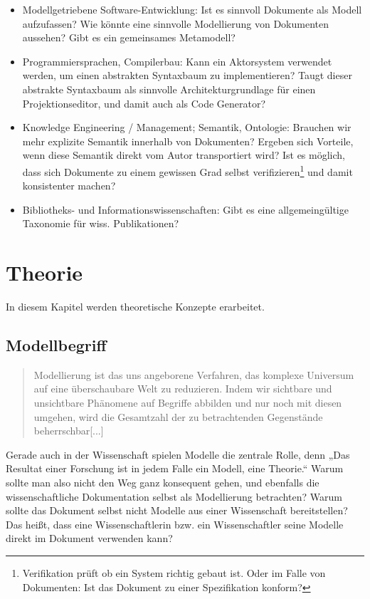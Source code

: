  
\begin{itemize}

\item
Modellgetriebene Software-Entwicklung: Ist es sinnvoll Dokumente als Modell aufzufassen? Wie könnte eine sinnvolle Modellierung von Dokumenten aussehen? Gibt es ein gemeinsames Metamodell?


\item
Programmiersprachen, Compilerbau: Kann ein Aktorsystem verwendet werden, um einen abstrakten Syntaxbaum zu implementieren? Taugt dieser abstrakte Syntaxbaum als sinnvolle Architekturgrundlage für einen Projektionseditor, und damit auch als Code Generator?


\item
Knowledge Engineering / Management; Semantik, Ontologie: Brauchen wir mehr explizite Semantik innerhalb von Dokumenten? Ergeben sich Vorteile, wenn diese Semantik direkt vom Autor transportiert wird? Ist es möglich, dass sich Dokumente zu einem gewissen Grad selbst verifizieren\footnote{Verifikation prüft ob ein System richtig gebaut ist. Oder im Falle von Dokumenten: Ist das Dokument zu einer Spezifikation konform?} und damit konsistenter machen?


\item
Bibliotheks- und Informationswissenschaften: Gibt es eine allgemeingültige Taxonomie für wiss. Publikationen?


\end{itemize}
 
\chapter{Theorie}\label{}
 
In diesem Kapitel werden theoretische Konzepte erarbeitet.

 
\section{Modellbegriff}\label{}
 
\begin{quote}
 Modellierung ist das uns angeborene Verfahren, das komplexe Universum auf eine überschaubare Welt zu reduzieren. Indem wir sichtbare und unsichtbare Phänomene auf Begriffe abbilden und nur noch mit diesen umgehen, wird die Gesamtzahl der zu betrachtenden Gegenstände beherrschbar[...] \citep[S.~7]{Ludewig}
\end{quote}
 
Gerade auch in der Wissenschaft spielen Modelle die zentrale Rolle, denn „Das Resultat einer Forschung ist in jedem Falle ein Modell, eine Theorie.“ \citep[S.~8]{Ludewig} Warum sollte man also nicht den Weg ganz konsequent gehen, und ebenfalls die wissenschaftliche Dokumentation selbst als Modellierung betrachten? Warum sollte das Dokument selbst nicht Modelle aus einer Wissenschaft bereitstellen? Das heißt, dass eine Wissenschaftlerin bzw. ein Wissenschaftler seine Modelle direkt im Dokument verwenden kann?

